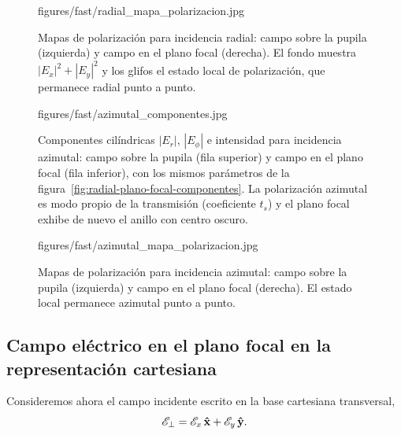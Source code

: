 \begin{figure}[H]
  \centering
    {figures/fast/radial_mapa_polarizacion.jpg}
  \caption{Mapas de polarización para incidencia radial: campo sobre la pupila (izquierda) y campo en el plano focal (derecha). El fondo muestra $|E_x|^2+|E_y|^2$ y los glifos el estado local de polarización, que permanece radial punto a punto.}
  \label{fig:radial-plano-focal-mapa-polarizacion}
\end{figure}

\begin{figure}[H]
  \centering
    {figures/fast/azimutal_componentes.jpg}
  \caption{Componentes cilíndricas $|E_r|$, $|E_\phi|$ e intensidad para incidencia azimutal: campo sobre la pupila (fila superior) y campo en el plano focal (fila inferior), con los mismos parámetros de la figura~\ref{fig:radial-plano-focal-componentes}. La polarización azimutal es modo propio de la transmisión (coeficiente $t_s$) y el plano focal exhibe de nuevo el anillo con centro oscuro.}
  \label{fig:azimutal-plano-focal-componentes}
\end{figure}

\begin{figure}[H]
  \centering
    {figures/fast/azimutal_mapa_polarizacion.jpg}
  \caption{Mapas de polarización para incidencia azimutal: campo sobre la pupila (izquierda) y campo en el plano focal (derecha). El estado local permanece azimutal punto a punto.}
  \label{fig:azimutal-plano-focal-mapa-polarizacion}
\end{figure}


\subsection{Campo eléctrico en el plano focal en la representación cartesiana}
\label{subsec:representacion_cartesiana}

Consideremos ahora el campo incidente escrito en la base cartesiana transversal,
\begin{equation}
  \mathscr E_\perp
  =
  \mathscr E_x\,\bm{\hat{\mathbf{x}}}
  +
  \mathscr E_y\,\bm{\hat{\mathbf{y}}}.
\end{equation}

